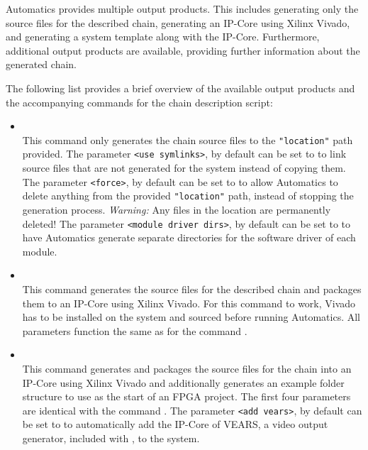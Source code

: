 Automatics provides multiple output products.
This includes generating only the source files for the described \asterics chain, generating an IP-Core using Xilinx Vivado, and generating a system template along with the IP-Core.
Furthermore, additional output products are available, providing further information about the generated chain.

The following list provides a brief overview of the available output products and the accompanying commands for the chain description script:
\begin{itemize}
\item {}\\
This command only generates the \asterics chain source files to the \texttt{"location"} path provided.
The parameter \texttt{<use symlinks>}, by default  can be set to  to link source files that are not generated for the system instead of copying them.
The parameter \texttt{<force>}, by default  can be set to  to allow Automatics to delete anything from the provided \texttt{"location"} path, instead of stopping the generation process. \emph{Warning:} Any files in the location are permanently deleted!
The parameter \texttt{<module driver dirs>}, by default  can be set to  to have Automatics generate separate directories for the software driver of each \asterics module.
\item {}\\
This command generates the source files for the described \asterics chain and packages them to an IP-Core using Xilinx Vivado.
For this command to work, Vivado has to be installed on the system and sourced before running Automatics.
All parameters function the same as for the command .
\item {}\\
This command generates and packages the source files for the \asterics chain into an IP-Core using Xilinx Vivado and additionally generates an example folder structure to use as the start of an FPGA project.
The first four parameters are identical with the command .
The parameter \texttt{<add vears>}, by default  can be set to  to automatically add the IP-Core of VEARS, a video output generator, included with \asterics, to the system.

\end{itemize}
